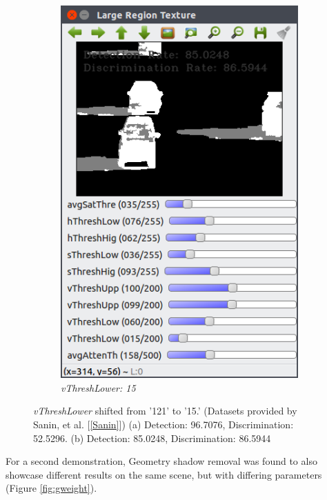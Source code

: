 \documentclass[12pt]{report}
\begin{document}
\begin{figure}
\begin{subfigure}{.49\linewidth}
    \includegraphics[width=1\linewidth]{figures/background/lr_highway1_thresh15.png}
    \caption{\textit{vThreshLower: 15}}
  \end{subfigure}
  \caption{\textit{vThreshLower} shifted from '121' to '15.' (Datasets provided by Sanin, et al. [\ref{Sanin}]) (a) Detection: 96.7076, Discrimination: 52.5296. (b) Detection: 85.0248, Discrimination: 86.5944}
  \label{fig:vthresh15}
\end{figure}

For a second demonstration, Geometry shadow removal was found to also showcase different results on the same scene, but with differing parameters (Figure \ref{fig:gweight}).
 
\end{document}
